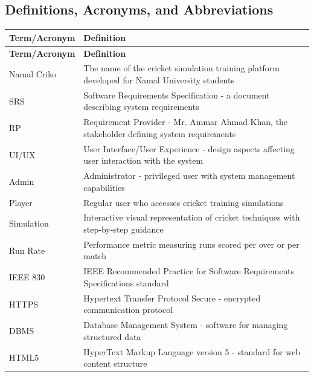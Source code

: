 \documentclass[12pt,a4paper]{article}
\begin{document}
\subsection{Definitions, Acronyms, and Abbreviations}
\begin{longtable}{|p{4cm}|p{10cm}|}
\hline
\textbf{Term/Acronym} & \textbf{Definition} \\ \hline
\endfirsthead
\hline
\textbf{Term/Acronym} & \textbf{Definition} \\ \hline
\endhead
\hline
\endfoot

Namal Criko & The name of the cricket simulation training platform developed for Namal University students \\ \hline

SRS & Software Requirements Specification - a document describing system requirements \\ \hline

RP & Requirement Provider - Mr. Ammar Ahmad Khan, the stakeholder defining system requirements \\ \hline

UI/UX & User Interface/User Experience - design aspects affecting user interaction with the system \\ \hline

Admin & Administrator - privileged user with system management capabilities \\ \hline

Player & Regular user who accesses cricket training simulations \\ \hline

Simulation & Interactive visual representation of cricket techniques with step-by-step guidance \\ \hline

Run Rate & Performance metric measuring runs scored per over or per match \\ \hline

IEEE 830 & IEEE Recommended Practice for Software Requirements Specifications standard \\ \hline

HTTPS & Hypertext Transfer Protocol Secure - encrypted communication protocol \\ \hline

DBMS & Database Management System - software for managing structured data \\ \hline

HTML5 & HyperText Markup Language version 5 - standard for web content structure \\ \hline


\end{longtable}
\end{document}
